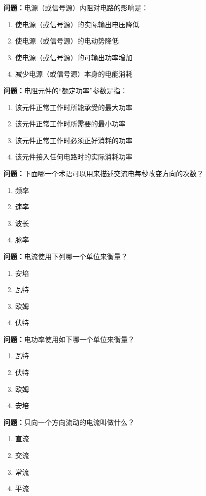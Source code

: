 \documentclass{ctexbook}
\begin{document}
\textbf{问题：}电源（或信号源）内阻对电路的影响是：
\begin{enumerate}[label=\Alph*), leftmargin=3em]
\item 使电源（或信号源）的实际输出电压降低
\item 使电源（或信号源）的电动势降低
\item 使电源（或信号源）的可输出功率增加
\item 减少电源（或信号源）本身的电能消耗
\end{enumerate}

\textbf{问题：}电阻元件的“额定功率”参数是指：
\begin{enumerate}[label=\Alph*), leftmargin=3em]
\item 该元件正常工作时所能承受的最大功率
\item 该元件正常工作时所需要的最小功率
\item 该元件正常工作时必须正好消耗的功率
\item 该元件接入任何电路时的实际消耗功率
\end{enumerate}

\textbf{问题：}下面哪一个术语可以用来描述交流电每秒改变方向的次数？
\begin{enumerate}[label=\Alph*), leftmargin=3em]
\item 频率
\item 速率
\item 波长
\item 脉率
\end{enumerate}

\textbf{问题：}电流使用下列哪一个单位来衡量？
\begin{enumerate}[label=\Alph*), leftmargin=3em]
\item 安培
\item 瓦特
\item 欧姆
\item 伏特
\end{enumerate}

\textbf{问题：}电功率使用如下哪一个单位来衡量？
\begin{enumerate}[label=\Alph*), leftmargin=3em]
\item 瓦特
\item 伏特
\item 欧姆
\item 安培
\end{enumerate}

\textbf{问题：}只向一个方向流动的电流叫做什么？
\begin{enumerate}[label=\Alph*), leftmargin=3em]
\item 直流
\item 交流
\item 常流
\item 平流
\end{enumerate}
\end{document}
